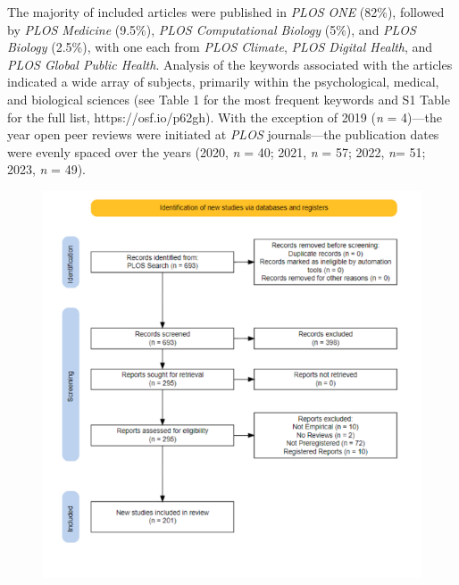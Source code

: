 \documentclass[authordate, empirical]{jote-new-article}
\begin{document}
	The majority of included articles were published in \emph{PLOS ONE} (82\%), followed by \emph{PLOS Medicine} (9.5\%), \emph{PLOS Computational Biology} (5\%), and \emph{PLOS Biology} (2.5\%), with one each from \emph{PLOS Climate}, \emph{PLOS Digital Health}, and \emph{PLOS Global Public Health}. Analysis of the keywords associated with the articles indicated a wide array of subjects, primarily within the psychological, medical, and biological sciences (see Table 1 for the most frequent keywords and S1 Table for the full list, https://osf.io/p62gh). With the exception of 2019 (\emph{n} = 4)—the year open peer reviews were initiated at \emph{PLOS} journals—the publication dates were evenly spaced over the years (2020, \emph{n} = 40; 2021, \emph{n} = 57; 2022, \emph{n}= 51; 2023, \emph{n} = 49).







	\begin{figure}
		\includegraphics[width=\linewidth]{media/image1.tiff}

		\caption{}

		\label{fig:rId8}


	\end{figure}
\end{document}
